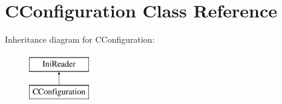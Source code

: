 \hypertarget{class_c_configuration}{
\section{CConfiguration Class Reference}
\label{class_c_configuration}
}
Inheritance diagram for CConfiguration:\begin{figure}[H]
\begin{center}
\leavevmode
\includegraphics[height=2cm]{class_c_configuration}
\end{center}
\end{figure}

